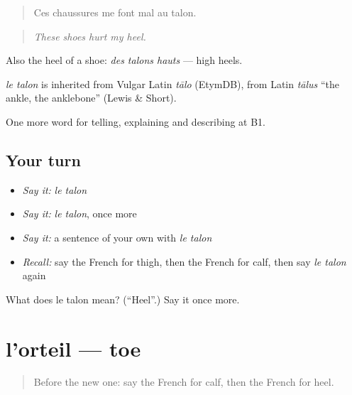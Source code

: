 \begin{quote}
Ces chaussures me font mal au talon.
\end{quote}

\begin{quote}
\emph{These shoes hurt my heel.}
\end{quote}

Also the heel of a shoe: \emph{des talons hauts} — high heels.

\begin{cousinweb}
\emph{le talon} is inherited from Vulgar Latin \emph{tālo} (EtymDB), from Latin \emph{tālus} \textquotedblleft{}the ankle, the anklebone\textquotedblright{} (Lewis \& Short).
\end{cousinweb}

\begin{grammarlens}[title={What you've built}]
One more word for telling, explaining and describing at B1.
\end{grammarlens}

\subsection*{Your turn}
\begin{itemize}
\raggedright
  \item \emph{Say it:} \emph{le talon}
  \item \emph{Say it:} \emph{le talon}, once more
  \item \emph{Say it:} a sentence of your own with \emph{le talon}
  \item \emph{Recall:} say the French for thigh, then the French for calf, then say \emph{le talon} again
\end{itemize}

\begin{tcolorbox}[breakable,colback=teal!4,colframe=teal!35!black,title={Before you move on}]
What does le talon mean? (\textquotedblleft{}Heel\textquotedblright{}.) Say it once more.
\end{tcolorbox}
\section[l'orteil]{l'orteil — toe}

\label{lesson:FR-C477-orteil}



\begin{quote}
Before the new one: say the French for calf, then the French for heel.
\end{quote}

